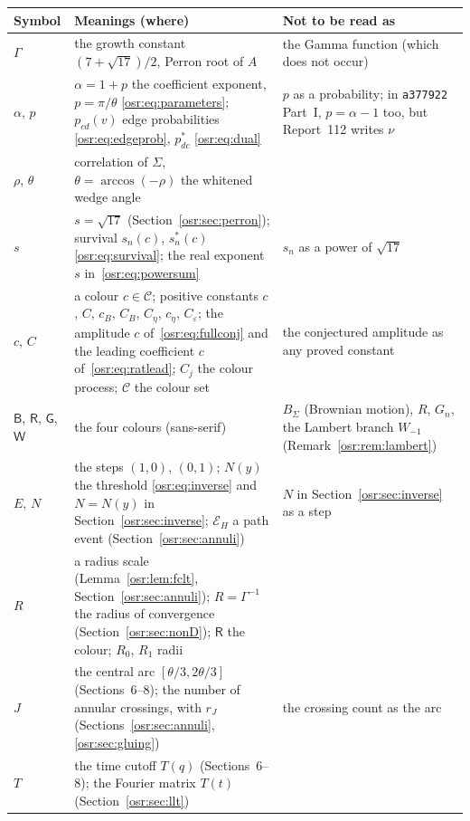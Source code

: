 \documentclass[11pt,letterpaper]{article}
\newcommand{\G}{\Gamma}\newcommand{\s}{\sqrt{17}}
\newcommand{\B}{\mathsf B}\newcommand{\RR}{\mathsf R}\newcommand{\GG}{\mathsf G}\newcommand{\W}{\mathsf W}
\numberwithin{equation}{section}
\begin{document}
\smallskip
\begingroup\small\renewcommand{\arraystretch}{1.1}
\begin{longtable}{@{}>{\raggedright\arraybackslash}p{0.55in}>{\raggedright\arraybackslash}p{3.75in}>{\raggedright\arraybackslash}p{1.85in}@{}}
\toprule
Symbol & Meanings (where) & Not to be read as\\
\midrule
\endhead
$\G$ & the growth constant $(7+\s)/2$, Perron root of $A$ & the Gamma
 function (which does not occur)\\
$\alpha$, $p$ & $\alpha=1+p$ the coefficient exponent, $p=\pi/\theta$
 \eqref{osr:eq:parameters}; $p_{cd}(v)$ edge probabilities
 \eqref{osr:eq:edgeprob}, $p^*_{dc}$ \eqref{osr:eq:dual} & $p$ as a
 probability; in \nolinkurl{a377922} Part~I, $p=\alpha-1$ too, but
 Report~112 writes $\nu$\\
$\rho$, $\theta$ & correlation of $\Sigma$, $\theta=\arccos(-\rho)$ the
 whitened wedge angle & \\
$s$ & $s=\s$ (Section~\ref{osr:sec:perron}); survival $s_n(c)$,
 $s^*_n(c)$ \eqref{osr:eq:survival}; the real exponent $s$
 in~\eqref{osr:eq:powersum} & $s_n$ as a power of $\s$\\
$c$, $C$ & a colour $c\in\mathcal C$; positive constants $c$, $C$, $c_B$,
 $C_B$, $C_\eta$, $c_\eta$, $C_\varepsilon$; the amplitude $c$
 of~\eqref{osr:eq:fullconj} and the leading coefficient $c$
 of~\eqref{osr:eq:ratlead}; $C_j$ the colour process; $\mathcal C$ the colour
 set & the conjectured amplitude as any proved constant\\
$\B$, $\RR$, $\GG$, $\W$ & the four colours (sans-serif) & $B_\Sigma$
 (Brownian motion), $R$, $G_n$, the Lambert branch $W_{-1}$
 (Remark~\ref{osr:rem:lambert})\\
$E$, $N$ & the steps $(1,0)$, $(0,1)$; $N(y)$ the threshold
 \eqref{osr:eq:inverse} and $N=N(y)$ in Section~\ref{osr:sec:inverse};
 $\mathcal E_H$ a path event (Section~\ref{osr:sec:annuli}) & $N$ in
 Section~\ref{osr:sec:inverse} as a step\\
$R$ & a radius scale (Lemma~\ref{osr:lem:fclt},
 Section~\ref{osr:sec:annuli}); $R=\G^{-1}$ the radius of convergence
 (Section~\ref{osr:sec:nonD}); $\RR$ the colour; $R_0$, $R_1$ radii & \\
$J$ & the central arc $[\theta/3,2\theta/3]$ (Sections~6--8); the number of
 annular crossings, with $r_J$ (Sections~\ref{osr:sec:annuli},
 \ref{osr:sec:gluing}) & the crossing count as the arc\\
$T$ & the time cutoff $T(q)$ (Sections~6--8); the Fourier matrix $T(t)$
 (Section~\ref{osr:sec:llt}) & \\

\end{longtable}
\end{document}
